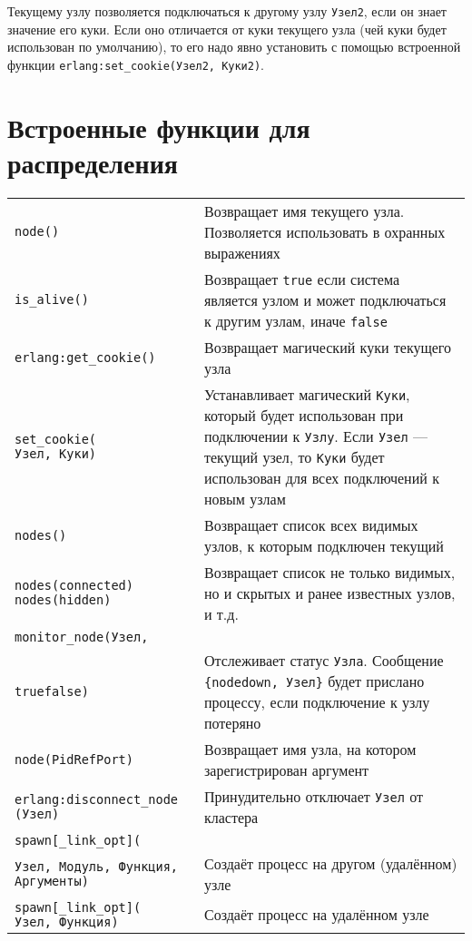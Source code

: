 Текущему узлу позволяется подключаться к другому узлу \texttt{Узел2}, если он
знает значение его куки.  Если оно отличается от куки текущего узла (чей куки 
будет использован по умолчанию), то его надо явно установить с помощью 
встроенной функции \texttt{erlang:set\_cookie(Узел2, Куки2)}.


\section{Встроенные функции для распределения}

\begin{center}
\begin{tabular}{|>{\raggedright}p{150pt}|>{\raggedright}p{280pt}|}
\hline
\multicolumn{2}{|p{326pt}|}{Встроенные функции для распределения}\tabularnewline
\hline
\texttt{node()}  & 
Возвращает имя текущего узла. Позволяется использовать в охранных выражениях
\tabularnewline
\hline
\texttt{is\_alive()}  & 
Возвращает \texttt{true} если система является узлом и может подключаться к другим 
узлам, иначе \texttt{false} \tabularnewline
\hline
\texttt{erlang:get\_cookie()}  & 
Возвращает магический куки текущего узла \tabularnewline
\hline
\texttt{set\_cookie(\\
	\qquad{}Узел, Куки)} & 
Устанавливает магический \texttt{Куки}, который будет использован при подключении 
к \texttt{Узлу}. Если \texttt{Узел} --- текущий узел, то \texttt{Куки} будет 
использован для всех подключений к новым узлам \tabularnewline
\hline
\texttt{nodes()}  & 
Возвращает список всех видимых узлов, к которым подключен текущий \tabularnewline
\hline
\texttt{nodes(connected)\\
	nodes(hidden)}  & 
Возвращает список не только видимых, но и скрытых и ранее известных узлов, и т.д. 
\tabularnewline
\hline
\texttt{monitor\_node(Узел,}\\
\texttt{\qquad{}true\textbar{}false)}  & 
Отслеживает статус \texttt{Узла}. Сообщение \texttt{\{nodedown, Узел\}} будет
прислано процессу, если подключение к узлу потеряно \tabularnewline
\hline
\texttt{node(Pid\textbar{}Ref\textbar{}Port)}  & 
Возвращает имя узла, на котором зарегистрирован аргумент \tabularnewline
\hline
\texttt{erlang:disconnect\_node\\
	\qquad(Узел)}  & 
Принудительно отключает \texttt{Узел} от кластера \tabularnewline
\hline
\texttt{spawn[\_link\textbar{}\_opt](}\\
\texttt{Узел, Модуль, Функция, 
	Аргументы)}  & Создаёт процесс на другом (удалённом) узле \tabularnewline
\hline
\texttt{spawn[\_link\textbar{}\_opt](\\
	Узел, Функция)}  & 
Создаёт процесс на удалённом узле \tabularnewline
\hline
\end{tabular}
\end{center}


